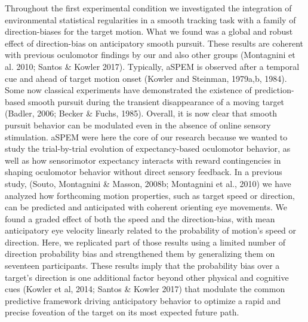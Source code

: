 \documentclass[profile,final,english, draft]{article}%
\begin{document}
Throughout the first experimental condition we investigated the integration of environmental statistical regularities in a smooth tracking task with a family of direction-biases for the target motion. What we found was a global and robust effect of direction-bias on anticipatory smooth pursuit. These results are coherent with previous oculomotor findings by our and also other groups (Montagnini et al. 2010; Santos \& Kowler 2017). Typically, aSPEM is observed after a temporal cue and ahead of target motion onset (Kowler and Steinman, 1979a,b, 1984). Some now classical experiments have demonstrated the existence of prediction-based smooth pursuit during the transient disappearance of a moving target (Badler, 2006; Becker \& Fuchs, 1985). Overall, it is now clear that smooth pursuit behavior can be modulated even in the absence of online sensory stimulation. aSPEM were here the core of our research because we wanted to study the trial-by-trial evolution of expectancy-based oculomotor behavior, as well as how sensorimotor expectancy interacts with reward contingencies in shaping oculomotor behavior without direct sensory feedback. In a previous study, (Souto, Montagnini \& Masson, 2008b; Montagnini et al., 2010) we have analyzed how forthcoming motion properties, such as target speed or direction, can be predicted and anticipated with coherent orienting eye movements. We found a graded effect of both the speed and the direction-bias, with mean anticipatory eye velocity linearly related to the probability of motion's speed or direction. Here, we replicated part of those results using a limited number of direction probability bias and strengthened them by generalizing them on seventeen participants. These results imply that the probability bias over a target's direction is one additional factor beyond other physical and cognitive cues (Kowler et al, 2014; Santos \& Kowler 2017) that modulate the common predictive framework driving anticipatory behavior to optimize a rapid and precise foveation of the target on its most expected future path. 
\end{document}
